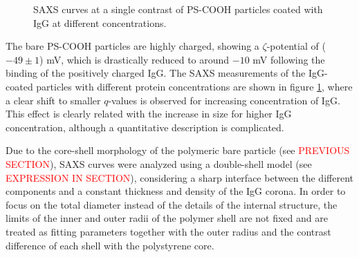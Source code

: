 \begin{figure}
	\centering
		
		\caption{SAXS curves at a single contrast of PS-COOH particles coated with IgG at different concentrations.}
		\label{fig:CoatedKiskerIgGSingleContrastSAXS}
\end{figure}

The bare PS-COOH particles are highly charged, showing a $\zeta$-potential of ($-49 \pm 1$) mV, which is drastically reduced to around $ -10$ mV following the binding of the positively charged IgG. The SAXS measurements of the IgG-coated particles with different protein concentrations are shown in figure \ref{fig:CoatedKiskerIgGSingleContrastSAXS}, where a clear shift to smaller $q$-values is observed for increasing concentration of IgG. This effect is clearly related with the increase in size for higher IgG concentration, although a quantitative description is complicated.

Due to the core-shell morphology of the polymeric bare particle (see \textcolor{red}{PREVIOUS SECTION}), SAXS curves were analyzed using a double-shell model (see \textcolor{red}{EXPRESSION IN SECTION}), considering a sharp interface between the different components and a constant thickness and density of the IgG corona. In order to focus on the total diameter instead of the details of the internal structure, the limits of the inner and outer radii of the polymer shell are not fixed and are treated as fitting parameters together with the outer radius and the contrast difference of each shell with the polystyrene core.

